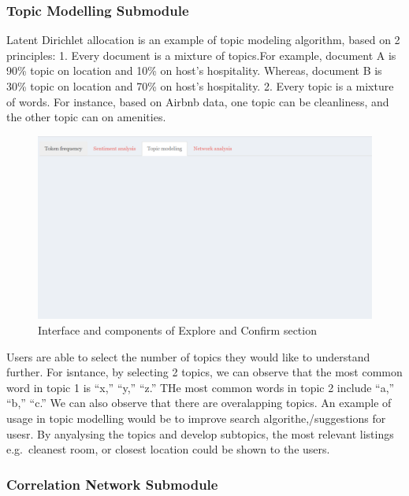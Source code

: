 \documentclass{acm_proc_article-sp}
\begin{document}
\hypertarget{topic-modelling-submodule}{%
\subsubsection{Topic Modelling
Submodule}\label{topic-modelling-submodule}}

Latent Dirichlet allocation is an example of topic modeling algorithm,
based on 2 principles: 1. Every document is a mixture of topics.For
example, document A is 90\% topic on location and 10\% on host's
hospitality. Whereas, document B is 30\% topic on location and 70\% on
host's hospitality. 2. Every topic is a mixture of words. For instance,
based on Airbnb data, one topic can be cleanliness, and the other topic
can on amenities.

\begin{figure}[H]

{\centering \includegraphics[width=1\linewidth]{images/topicmodelling} 

}

\caption{Interface and components of Explore and Confirm section}\label{fig:unnamed-chunk-7}
\end{figure}

Users are able to select the number of topics they would like to
understand further. For isntance, by selecting 2 topics, we can observe
that the most common word in topic 1 is ``x,'' ``y,'' ``z.'' THe most
common words in topic 2 include ``a,'' ``b,'' ``c.'' We can also observe
that there are overalapping topics. An example of usage in topic
modelling would be to improve search algorithe,/suggestions for usesr.
By anyalysing the topics and develop subtopics, the most relevant
listings e.g.~cleanest room, or closest location could be shown to the
users.

\hypertarget{correlation-network-submodule}{%
\subsubsection{Correlation Network
Submodule}\label{correlation-network-submodule}}
\end{document}
